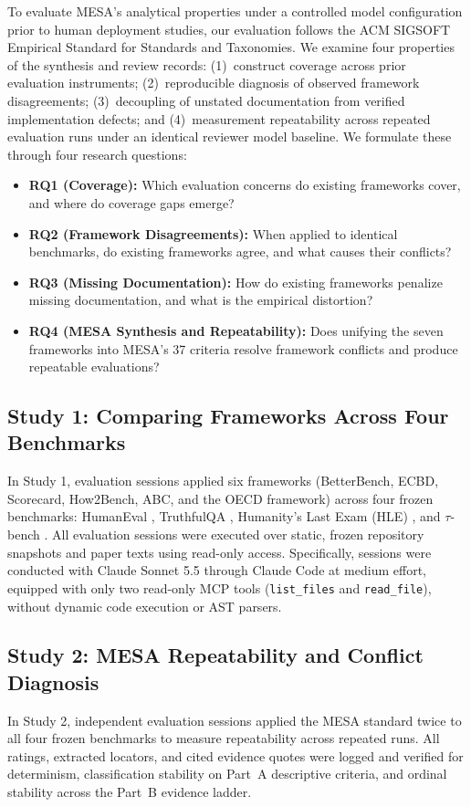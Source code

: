 \documentclass[runningheads]{llncs}
\begin{document}
To evaluate MESA's analytical properties under a controlled model configuration prior to human deployment studies, our evaluation follows the ACM SIGSOFT Empirical Standard for Standards and Taxonomies. We examine four properties of the synthesis and review records: (1)~construct coverage across prior evaluation instruments; (2)~reproducible diagnosis of observed framework disagreements; (3)~decoupling of unstated documentation from verified implementation defects; and (4)~measurement repeatability across repeated evaluation runs under an identical reviewer model baseline. We formulate these through four research questions:
\begin{itemize}[leftmargin=*]
    \item \textbf{RQ1 (Coverage):} Which evaluation concerns do existing frameworks cover, and where do coverage gaps emerge?
    \item \textbf{RQ2 (Framework Disagreements):} When applied to identical benchmarks, do existing frameworks agree, and what causes their conflicts?
    \item \textbf{RQ3 (Missing Documentation):} How do existing frameworks penalize missing documentation, and what is the empirical distortion?
    \item \textbf{RQ4 (MESA Synthesis and Repeatability):} Does unifying the seven frameworks into MESA's 37 criteria resolve framework conflicts and produce repeatable evaluations?
\end{itemize}

\subsection{Study 1: Comparing Frameworks Across Four Benchmarks}
In Study 1, evaluation sessions applied six frameworks (BetterBench, ECBD, Scorecard, How2Bench, ABC, and the OECD framework) across four frozen benchmarks: HumanEval \cite{human_eval_repository}, TruthfulQA \cite{truthfulqa_repository}, Humanity's Last Exam (HLE) \cite{phan_etal_hle_2025}, and $\tau$-bench \cite{tau_bench_repository}. All evaluation sessions were executed over static, frozen repository snapshots and paper texts using read-only access. Specifically, sessions were conducted with Claude Sonnet 5.5 through Claude Code at medium effort, equipped with only two read-only MCP tools (\texttt{list\_files} and \texttt{read\_file}), without dynamic code execution or AST parsers.

\subsection{Study 2: MESA Repeatability and Conflict Diagnosis}
In Study 2, independent evaluation sessions applied the MESA standard twice to all four frozen benchmarks to measure repeatability across repeated runs. All ratings, extracted locators, and cited evidence quotes were logged and verified for determinism, classification stability on Part~A descriptive criteria, and ordinal stability across the Part~B evidence ladder. 
\end{document}
